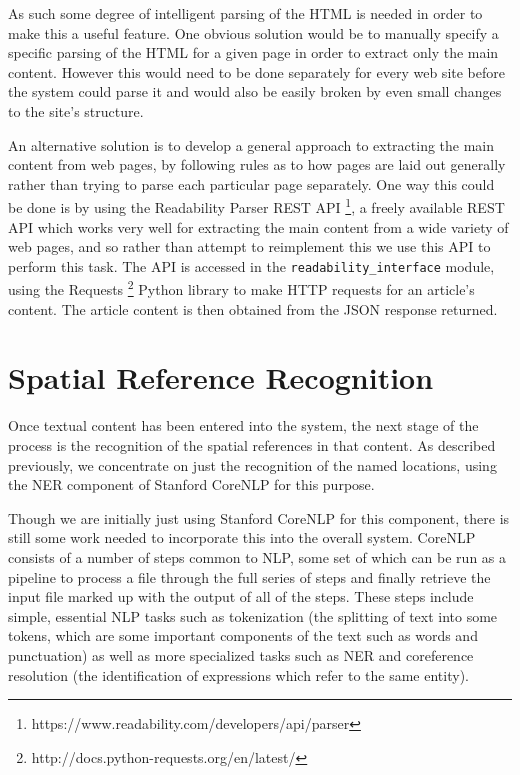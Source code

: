 \documentclass[12pt, a4paper]{report}
\begin{document}
As such some degree of intelligent parsing of the HTML is needed in order to make this a useful feature. One obvious solution would be to manually specify a specific parsing of the HTML for a given page in order to extract only the main content. However this would need to be done separately for every web site before the system could parse it and would also be easily broken by even small changes to the site's structure.

An alternative solution is to develop a general approach to extracting the main content from web pages, by following rules as to how pages are laid out generally rather than trying to parse each particular page separately. One way this could be done is by using the Readability Parser REST API \footnote{https://www.readability.com/developers/api/parser}, a freely available REST API which works very well for extracting the main content from a wide variety of web pages, and so rather than attempt to reimplement this we use this API  to perform this task. The API is accessed in the \verb#readability_interface# module, using the Requests \footnote{http://docs.python-requests.org/en/latest/} Python library to make HTTP requests for an article's content. The article content is then obtained from the JSON response returned. 

\section{Spatial Reference Recognition}

Once textual content has been entered into the system, the next stage of the process is the recognition of the spatial references in that content. As described previously, we concentrate on just the recognition of the named locations, using the NER component of Stanford CoreNLP for this purpose.

Though we are initially just using Stanford CoreNLP for this component, there is still some work needed to incorporate this into the overall system. CoreNLP \citep{manning2014} consists of a number of steps common to NLP, some set of which can be run as a pipeline to process a file through the full series of steps and finally retrieve the input file marked up with the output of all of the steps. These steps include simple, essential NLP tasks such as tokenization (the splitting of text into some tokens, which are some important components of the text such as words and punctuation) as well as more specialized tasks such as NER and coreference resolution (the identification of expressions which refer to the same entity).
\end{document}
